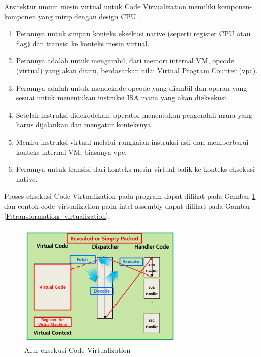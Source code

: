 Arsitektur umum mesin virtual untuk Code Virtualization memiliki komponen-komponen yang mirip dengan design CPU \cite{Sal18, Hac24}.
\begin{enumerate}
	\item {} Perannya untuk simpan konteks eksekusi native (seperti register CPU atau flag) dan transisi ke konteks mesin virtual.
	\item {} Perannya adalah untuk mengambil, dari memori internal VM, opcode (virtual) yang akan ditiru, berdasarkan nilai Virtual Program Counter (vpc).
	\item {} Perannya adalah untuk mendekode opcode yang diambil dan operan yang sesuai untuk menentukan instruksi ISA mana yang akan dieksekusi.
	\item {} Setelah instruksi didekodekan, operator menentukan pengendali mana yang harus dijalankan dan mengatur konteksnya.
	\item {} Meniru instruksi virtual melalui rangkaian instruksi asli dan memperbarui konteks internal VM, biasanya vpc.
	\item {} Perannya untuk transisi dari konteks mesin virtual balik ke konteks eksekusi native.
\end{enumerate}

Proses eksekusi Code Virtualization pada program dapat dilihat pada Gambar \ref{F:execution_virtualization} dan contoh code virtualization pada intel assembly dapat dilihat pada Gambar \ref{F:transformation_virtualization}.

\begin{figure}
	\centering
	\includegraphics[width=0.7\textwidth]
	{assets/pics/virtualization_execution.png}
	\caption{Alur eksekusi Code Virtualization \cite{Don20}}
	\label{F:execution_virtualization}
\end{figure}

